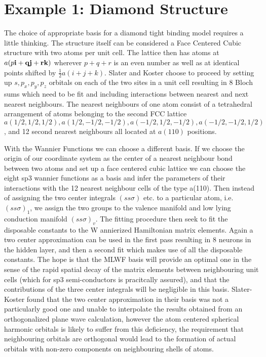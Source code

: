 \section{Example 1: Diamond Structure}
The choice of appropriate basis for a diamond tight binding model requires a little thinking.
The structure itself can be considered a Face Centered Cubic structure with two atoms per unit cell.
The lattice then has atoms at $a(p\bf{i} + q\bf{j} + r\bf{k})$ wherever $p+q+r$ is an even number
as well as at identical points shifted by $\frac{1}{2}a(i+j+k)$. Slater and Koster choose to proceed
by setting up $s,p_{x},p_{y},p_{z}$ orbitals on each of the two sites in a unit cell resulting in 8 
Bloch sums which need to be fit and including interactions between nearest and next nearest neighbours.
The nearest neighbours of one atom consist of a tetrahedral arrangement of atoms belonging to the 
second FCC lattice $a(1/2,1/2,1/2), a(1/2,-1/2,-1/2), a(-1/2,1/2,-1/2), a(-1/2,-1/2,1/2)$,
and 12 second nearest neighbours all located at $a(110)$ positions.

With the Wannier Functions we can choose a different basis. If we choose the origin of our coordinate
system as the center of a nearest neighbour bond between two atoms and set up a face centered cubic lattice
we can choose the eight sp3 wannier functions as a basis and infer the parameters
of their interactions with the 12 nearest neighbour cells of the type a(110). Then instead
of assigning the two center integrals $(ss\sigma)$ etc. to a particular atom, 
i.e. $(ss\sigma)_1$, we assign the two groups to the valence manifold and low lying conduction manifold 
$(ss\sigma)_{v}$. The fitting procedure then seek to fit the disposable constants to the W
annierized Hamiltonian matrix elements. Again a two center approximation can be used in the first pass
resulting in 8 neurons in the hidden layer, and then a second fit which makes use of 
all the disposable constants. The hope is that the MLWF basis will provide an optimal one in the
sense of the rapid spatial decay of the matrix elements between neighbouring unit cells 
(which for sp3 semi-conductors is pracitcally assured), and that the contributions of the three center
integrals will be negligible in this basis. Slater-Koster found that the two center approximation in their
basis was not a particularly good one and unable to interpolate the results obtained
from an orthogonalized plane wave calculation, however the atom centered spherical harmonic orbitals is likely 
to suffer from this deficiency, the requirement that neighbouring orbitals are orthogonal would lead to 
the formation of actual orbitals with non-zero components on neighbouring shells of atoms. 


